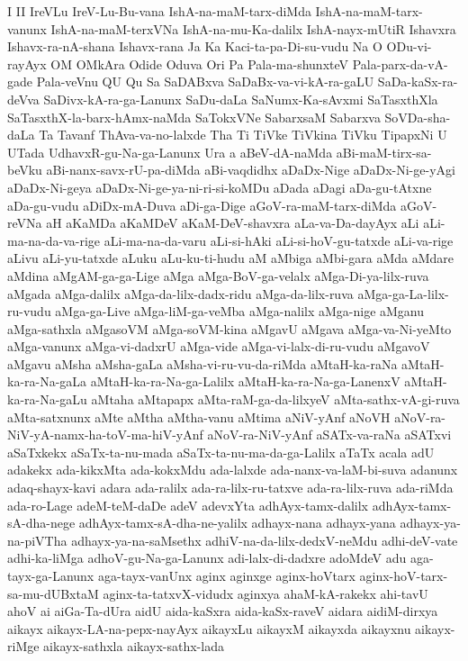 {I
II
IreVLu
IreV-Lu-Bu-vana
IshA-na-maM-tarx-diMda
IshA-na-maM-tarx-vanunx
IshA-na-maM-terxVNa
IshA-na-mu-Ka-dalilx
IshA-nayx-mUtiR
Ishavxra
Ishavx-ra-nA-shana
Ishavx-rana
Ja
Ka
Kaci-ta-pa-Di-su-vudu
Na
O
ODu-vi-rayAyx
OM
OMkAra
Odide
Oduva
Ori
Pa
Pala-ma-shunxteV
Pala-parx-da-vA-gade
Pala-veVnu
QU
Qu
Sa
SaDABxva
SaDaBx-va-vi-kA-ra-gaLU
SaDa-kaSx-ra-deVva
SaDivx-kA-ra-ga-Lanunx
SaDu-daLa
SaNumx-Ka-sAvxmi
SaTasxthXla
SaTasxthX-la-barx-hAmx-naMda
SaTokxVNe
SabarxsaM
Sabarxva
SoVDa-sha-daLa
Ta
Tavanf
ThAva-va-no-lalxde
Tha
Ti
TiVke
TiVkina
TiVku
TipapxNi
U
UTada
UdhavxR-gu-Na-ga-Lanunx
Ura
a
aBeV-dA-naMda
aBi-maM-tirx-sa-beVku
aBi-nanx-savx-rU-pa-diMda
aBi-vaqdidhx
aDaDx-Nige
aDaDx-Ni-ge-yAgi
aDaDx-Ni-geya
aDaDx-Ni-ge-ya-ni-ri-si-koMDu
aDada
aDagi
aDa-gu-tAtxne
aDa-gu-vudu
aDiDx-mA-Duva
aDi-ga-Dige
aGoV-ra-maM-tarx-diMda
aGoV-reVNa
aH
aKaMDa
aKaMDeV
aKaM-DeV-shavxra
aLa-va-Da-dayAyx
aLi
aLi-ma-na-da-va-rige
aLi-ma-na-da-varu
aLi-si-hAki
aLi-si-hoV-gu-tatxde
aLi-va-rige
aLivu
aLi-yu-tatxde
aLuku
aLu-ku-ti-hudu
aM
aMbiga
aMbi-gara
aMda
aMdare
aMdina
aMgAM-ga-ga-Lige
aMga
aMga-BoV-ga-velalx
aMga-Di-ya-lilx-ruva
aMgada
aMga-dalilx
aMga-da-lilx-dadx-ridu
aMga-da-lilx-ruva
aMga-ga-La-lilx-ru-vudu
aMga-ga-Live
aMga-liM-ga-veMba
aMga-nalilx
aMga-nige
aMganu
aMga-sathxla
aMgasoVM
aMga-soVM-kina
aMgavU
aMgava
aMga-va-Ni-yeMto
aMga-vanunx
aMga-vi-dadxrU
aMga-vide
aMga-vi-lalx-di-ru-vudu
aMgavoV
aMgavu
aMsha
aMsha-gaLa
aMsha-vi-ru-vu-da-riMda
aMtaH-ka-raNa
aMtaH-ka-ra-Na-gaLa
aMtaH-ka-ra-Na-ga-Lalilx
aMtaH-ka-ra-Na-ga-LanenxV
aMtaH-ka-ra-Na-gaLu
aMtaha
aMtapapx
aMta-raM-ga-da-lilxyeV
aMta-sathx-vA-gi-ruva
aMta-satxnunx
aMte
aMtha
aMtha-vanu
aMtima
aNiV-yAnf
aNoVH
aNoV-ra-NiV-yA-namx-ha-toV-ma-hiV-yAnf
aNoV-ra-NiV-yAnf
aSATx-va-raNa
aSATxvi
aSaTxkekx
aSaTx-ta-nu-mada
aSaTx-ta-nu-ma-da-ga-Lalilx
aTaTx
acala
adU
adakekx
ada-kikxMta
ada-kokxMdu
ada-lalxde
ada-nanx-va-laM-bi-suva
adanunx
adaq-shayx-kavi
adara
ada-ralilx
ada-ra-lilx-ru-tatxve
ada-ra-lilx-ruva
ada-riMda
ada-ro-Lage
adeM-teM-daDe
adeV
adevxYta
adhAyx-tamx-dalilx
adhAyx-tamx-sA-dha-nege
adhAyx-tamx-sA-dha-ne-yalilx
adhayx-nana
adhayx-yana
adhayx-ya-na-piVTha
adhayx-ya-na-saMsethx
adhiV-na-da-lilx-dedxV-neMdu
adhi-deV-vate
adhi-ka-liMga
adhoV-gu-Na-ga-Lanunx
adi-lalx-di-dadxre
adoMdeV
adu
aga-tayx-ga-Lanunx
aga-tayx-vanUnx
aginx
aginxge
aginx-hoVtarx
aginx-hoV-tarx-sa-mu-dUBxtaM
aginx-ta-tatxvX-vidudx
aginxya
ahaM-kA-rakekx
ahi-tavU
ahoV
ai
aiGa-Ta-dUra
aidU
aida-kaSxra
aida-kaSx-raveV
aidara
aidiM-dirxya
aikayx
aikayx-LA-na-pepx-nayAyx
aikayxLu
aikayxM
aikayxda
aikayxnu
aikayx-riMge
aikayx-sathxla
aikayx-sathx-lada
}
